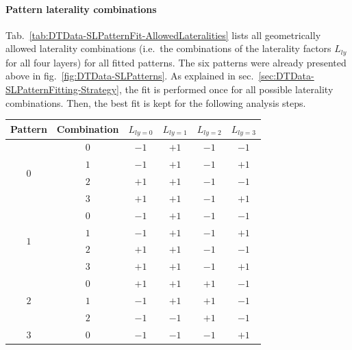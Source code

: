 \paragraph{Pattern laterality combinations}
Tab.\ \ref{tab:DTData-SLPatternFit-AllowedLateralities} lists all geometrically allowed laterality combinations (i.e.\ the combinations of the laterality factors $L_{ly}$ for all four layers) for all fitted patterns. The six patterns were already presented above in fig.\ \ref{fig:DTData-SLPatterns}. As explained in sec.\ \ref{sec:DTData-SLPatternFitting-Strategy}, the fit is performed once for all possible laterality combinations. Then, the best fit is kept for the following analysis steps.
\begin{table}[htb]
    \centering
    \begin{tabular}{|c|c|c|c|c|c|} 
        \hline
        Pattern & Combination & $L_{ly=0}$ & $L_{ly=1}$ & $L_{ly=2}$ & $L_{ly=3}$ \\ \hline
        \multirow{4}{*}{$0$} & $0$ & $-1$ & $+1$ & $-1$ & $-1$ \\
                             & $1$ & $-1$ & $+1$ & $-1$ & $+1$ \\
                             & $2$ & $+1$ & $+1$ & $-1$ & $-1$ \\
                             & $3$ & $+1$ & $+1$ & $-1$ & $+1$ \\ \hline
        \multirow{4}{*}{$1$} & $0$ & $-1$ & $+1$ & $-1$ & $-1$ \\
                             & $1$ & $-1$ & $+1$ & $-1$ & $+1$ \\
                             & $2$ & $+1$ & $+1$ & $-1$ & $-1$ \\
                             & $3$ & $+1$ & $+1$ & $-1$ & $+1$ \\ \hline
        \multirow{3}{*}{$2$} & $0$ & $+1$ & $+1$ & $+1$ & $-1$ \\
                             & $1$ & $-1$ & $+1$ & $+1$ & $-1$ \\
                             & $2$ & $-1$ & $-1$ & $+1$ & $-1$ \\ \hline
        \multirow{3}{*}{$3$} & $0$ & $-1$ & $-1$ & $-1$ & $+1$ \\

\end{tabular}
\end{table}
